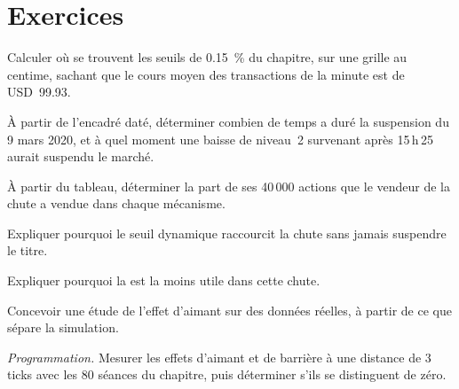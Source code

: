 \section{Exercices}

\begin{exercise}[$\star$]\label{exo:mx:circuit-breakers-and-halts:1}
Calculer où se trouvent les seuils de 0.15~\% du chapitre, sur une grille au centime, sachant que le cours moyen des transactions de la minute est de USD~99.93.
\end{exercise}

\begin{exercise}[$\star$]\label{exo:mx:circuit-breakers-and-halts:2}
À partir de l'encadré daté, déterminer combien de temps a duré la suspension du 9 mars 2020, et à quel moment une baisse de niveau~2 survenant après 15\,h\,25 aurait suspendu le marché.
\end{exercise}

\begin{exercise}[$\star$]\label{exo:mx:circuit-breakers-and-halts:3}
À partir du tableau, déterminer la part de ses 40\,000 actions que le vendeur de la chute a vendue dans chaque mécanisme.
\end{exercise}

\begin{exercise}[$\star\star$]\label{exo:mx:circuit-breakers-and-halts:4}
Expliquer pourquoi le seuil dynamique raccourcit la chute sans jamais suspendre le titre.
\end{exercise}

\begin{exercise}[$\star\star$]\label{exo:mx:circuit-breakers-and-halts:5}
Expliquer pourquoi la  est la moins utile dans cette chute.
\end{exercise}

\begin{exercise}[$\star\star$]\label{exo:mx:circuit-breakers-and-halts:6}
Concevoir une étude de l'effet d'aimant sur des données réelles, à partir de ce que sépare la simulation.
\end{exercise}

\begin{exercise}[$\star\star\star$]\label{exo:mx:circuit-breakers-and-halts:7}
\emph{Programmation.} Mesurer les effets d'aimant et de barrière à une distance de 3 ticks avec les 80 séances du chapitre, puis déterminer s'ils se distinguent de zéro.
\end{exercise}

